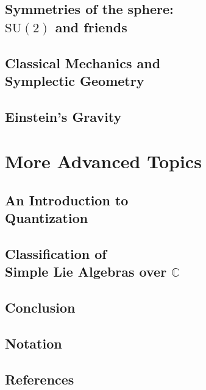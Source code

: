\documentclass[12pt, twoside, openany]{book}
\newcommand{\1}{\mathbbm{1}}
\begin{document}
\chapter[Symmetries of the sphere: $\mathrm{SU}(2)$ and friends]{Symmetries of the sphere: \\$\mathrm{SU}(2)$ and friends}

\chapter[Classical Mechanics and Symplectic Geometry]{Classical Mechanics and\\ Symplectic Geometry}\label{ch:Symplectic}

\chapter{Einstein's Gravity}\label{ch:GR}

\part{More Advanced Topics}\thispagestyle{empty}

\chapter[An Introduction to Quantization]{An Introduction to \\Quantization}

\chapter[Classification of Simple Lie Algebras over $\mathbb C$]{Classification of\\ Simple Lie Algebras over $\mathbb{C}$}

\chapter*{Conclusion}\thispagestyle{empty}



\chapter*{Notation}\thispagestyle{empty}

\chapter*{References}\thispagestyle{empty}


\printindex
\end{document}
